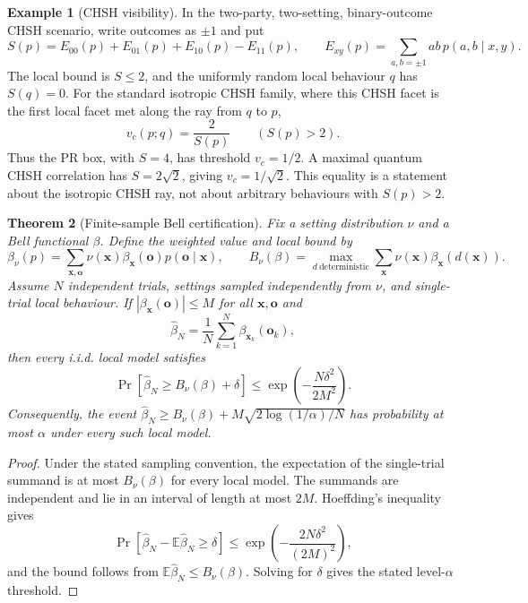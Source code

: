 \documentclass[11pt]{article}
\theoremstyle{plain}
\newtheorem{theorem}{Theorem}[section]
\theoremstyle{definition}
\newtheorem{example}[theorem]{Example}
\theoremstyle{remark}
\begin{document}
\begin{example}[CHSH visibility]
\label{ex:chsh-visibility}
In the two-party, two-setting, binary-outcome CHSH scenario, write outcomes as
\(\pm1\) and put
\[
S(p)=E_{00}(p)+E_{01}(p)+E_{10}(p)-E_{11}(p),
\qquad
E_{xy}(p)=\sum_{a,b=\pm1}ab\,p(a,b\mid x,y).
\]
The local bound is \(S\le2\), and the uniformly random local behaviour \(q\) has
\(S(q)=0\). For the standard isotropic CHSH family, where this CHSH facet is the
first local facet met along the ray from \(q\) to \(p\),
\[
v_c(p;q)=\frac{2}{S(p)}
\qquad(S(p)>2).
\]
Thus the PR box, with \(S=4\), has threshold \(v_c=1/2\). A maximal quantum CHSH
correlation has \(S=2\sqrt2\), giving \(v_c=1/\sqrt2\). This equality is a
statement about the isotropic CHSH ray, not about arbitrary behaviours with
\(S(p)>2\).
\end{example}

\begin{theorem}[Finite-sample Bell certification]
\label{thm:finite-sample-bell}
Fix a setting distribution \(\nu\) and a Bell functional \(\beta\). Define the
weighted value and local bound by
\[
\beta_\nu(p)=
\sum_{\mathbf x,
\mathbf o}
\nu(\mathbf x)\beta_{\mathbf x}(\mathbf o)p(\mathbf o\mid\mathbf x),
\qquad
B_\nu(\beta)=
\max_{d\ \mathrm{deterministic}}
\sum_{\mathbf x}
\nu(\mathbf x)\beta_{\mathbf x}(d(\mathbf x)).
\]
Assume \(N\) independent trials, settings sampled independently from \(\nu\), and
single-trial local behaviour. If \(|\beta_{\mathbf x}(\mathbf o)|\le M\) for all \(\mathbf x,\mathbf o\) and
\[
\widehat\beta_N=\frac1N\sum_{k=1}^N
\beta_{\mathbf x_k}(\mathbf o_k),
\]
then every i.i.d. local model satisfies
\[
\Pr\!\left[
\widehat\beta_N\ge B_\nu(\beta)+\delta
\right]
\le
\exp\!\left(-\frac{N\delta^2}{2M^2}\right).
\]
Consequently, the event
\(\widehat\beta_N\ge B_\nu(\beta)+M\sqrt{2\log(1/\alpha)/N}\) has probability at
most \(\alpha\) under every such local model.
\end{theorem}

\begin{proof}
Under the stated sampling convention, the expectation of the single-trial
summand is at most \(B_\nu(\beta)\) for every local model. The summands are
independent and lie in an interval of length at most \(2M\). Hoeffding's
inequality \cite{hoeffding} gives
\[
\Pr\!\left[
\widehat\beta_N-\mathbb E\widehat\beta_N\ge\delta
\right]
\le
\exp\!\left(-\frac{2N\delta^2}{(2M)^2}\right),
\]
and the bound follows from \(\mathbb E\widehat\beta_N\le B_\nu(\beta)\). Solving
for \(\delta\) gives the stated level-\(\alpha\) threshold.
\end{proof}
\end{document}
